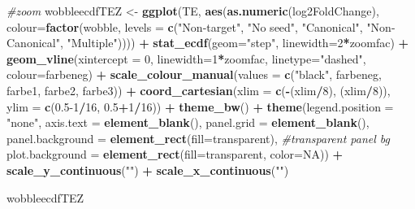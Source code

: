 \documentclass[
]{article}
\newenvironment{Shaded}{\begin{snugshade}}{\end{snugshade}}
\newcommand{\AttributeTok}[1]{\textcolor[rgb]{0.13,0.29,0.53}{#1}}
\newcommand{\CommentTok}[1]{\textcolor[rgb]{0.56,0.35,0.01}{\textit{#1}}}
\newcommand{\ConstantTok}[1]{\textcolor[rgb]{0.56,0.35,0.01}{#1}}
\newcommand{\DecValTok}[1]{\textcolor[rgb]{0.00,0.00,0.81}{#1}}
\newcommand{\FloatTok}[1]{\textcolor[rgb]{0.00,0.00,0.81}{#1}}
\newcommand{\FunctionTok}[1]{\textcolor[rgb]{0.13,0.29,0.53}{\textbf{#1}}}
\newcommand{\NormalTok}[1]{#1}
\newcommand{\OtherTok}[1]{\textcolor[rgb]{0.56,0.35,0.01}{#1}}
\newcommand{\SpecialCharTok}[1]{\textcolor[rgb]{0.81,0.36,0.00}{\textbf{#1}}}
\newcommand{\StringTok}[1]{\textcolor[rgb]{0.31,0.60,0.02}{#1}}
\begin{document}
\begin{Shaded}
\begin{Highlighting}[]
\CommentTok{\#zoom}
\NormalTok{wobbleecdfTEZ }\OtherTok{\textless{}{-}} \FunctionTok{ggplot}\NormalTok{(TE, }\FunctionTok{aes}\NormalTok{(}\FunctionTok{as.numeric}\NormalTok{(log2FoldChange), }\AttributeTok{colour=}\FunctionTok{factor}\NormalTok{(wobble, }\AttributeTok{levels =} \FunctionTok{c}\NormalTok{(}\StringTok{"Non{-}target"}\NormalTok{, }\StringTok{"No seed"}\NormalTok{, }\StringTok{"Canonical"}\NormalTok{, }\StringTok{"Non{-}Canonical"}\NormalTok{, }\StringTok{"Multiple"}\NormalTok{)))) }\SpecialCharTok{+} 
  \FunctionTok{stat\_ecdf}\NormalTok{(}\AttributeTok{geom=}\StringTok{"step"}\NormalTok{, }\AttributeTok{linewidth=}\DecValTok{2}\SpecialCharTok{*}\NormalTok{zoomfac) }\SpecialCharTok{+}
  \FunctionTok{geom\_vline}\NormalTok{(}\AttributeTok{xintercept =} \DecValTok{0}\NormalTok{, }\AttributeTok{linewidth=}\DecValTok{1}\SpecialCharTok{*}\NormalTok{zoomfac, }\AttributeTok{linetype=}\StringTok{"dashed"}\NormalTok{, }\AttributeTok{colour=}\NormalTok{farbeneg) }\SpecialCharTok{+}
  \FunctionTok{scale\_colour\_manual}\NormalTok{(}\AttributeTok{values =} \FunctionTok{c}\NormalTok{(}\StringTok{"black"}\NormalTok{, farbeneg, farbe1, farbe2, farbe3)) }\SpecialCharTok{+}
  \FunctionTok{coord\_cartesian}\NormalTok{(}\AttributeTok{xlim =} \FunctionTok{c}\NormalTok{(}\SpecialCharTok{{-}}\NormalTok{(xlim}\SpecialCharTok{/}\DecValTok{8}\NormalTok{), (xlim}\SpecialCharTok{/}\DecValTok{8}\NormalTok{)), }\AttributeTok{ylim =} \FunctionTok{c}\NormalTok{(}\FloatTok{0.5}\DecValTok{{-}1}\SpecialCharTok{/}\DecValTok{16}\NormalTok{, }\FloatTok{0.5}\SpecialCharTok{+}\DecValTok{1}\SpecialCharTok{/}\DecValTok{16}\NormalTok{)) }\SpecialCharTok{+} 
  \FunctionTok{theme\_bw}\NormalTok{() }\SpecialCharTok{+}
  \FunctionTok{theme}\NormalTok{(}\AttributeTok{legend.position =} \StringTok{"none"}\NormalTok{, }\AttributeTok{axis.text =} \FunctionTok{element\_blank}\NormalTok{(), }\AttributeTok{panel.grid =} \FunctionTok{element\_blank}\NormalTok{(),}
        \AttributeTok{panel.background =} \FunctionTok{element\_rect}\NormalTok{(}\AttributeTok{fill=}\StringTok{\textquotesingle{}transparent\textquotesingle{}}\NormalTok{), }\CommentTok{\#transparent panel bg}
        \AttributeTok{plot.background =} \FunctionTok{element\_rect}\NormalTok{(}\AttributeTok{fill=}\StringTok{\textquotesingle{}transparent\textquotesingle{}}\NormalTok{, }\AttributeTok{color=}\ConstantTok{NA}\NormalTok{)) }\SpecialCharTok{+}
  \FunctionTok{scale\_y\_continuous}\NormalTok{(}\StringTok{""}\NormalTok{) }\SpecialCharTok{+} \FunctionTok{scale\_x\_continuous}\NormalTok{(}\StringTok{""}\NormalTok{)}


\NormalTok{wobbleecdfTEZ}
\end{Highlighting}
\end{Shaded}
\end{document}
